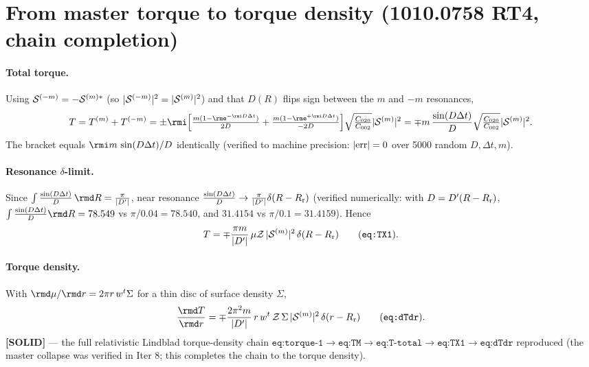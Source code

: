 \documentclass{article}
\begin{document}
\section*{From master torque to torque density (1010.0758 RT4, chain completion)}

\paragraph{Total torque.} Using ${\cal S}^{(-m)}=-{\cal S}^{(m)\ast}$ (so $|{\cal S}^{(-m)}|^2=|{\cal S}^{(m)}|^2$)
and that $D(R)$ flips sign between the $m$ and $-m$ resonances,
\begin{equation}
  T=T^{(m)}+T^{(-m)}
   =\pm\rmi\Bigl[\tfrac{m(1-\rme^{-\rmi D\Delta t})}{2D}+\tfrac{m(1-\rme^{+\rmi D\Delta t})}{-2D}\Bigr]
     \sqrt{\tfrac{C_{020}}{C_{002}}}|{\cal S}^{(m)}|^2
   =\mp m\,\frac{\sin(D\Delta t)}{D}\sqrt{\tfrac{C_{020}}{C_{002}}}|{\cal S}^{(m)}|^2 .
\end{equation}
The bracket equals $\rmi m\,\sin(D\Delta t)/D$ identically (verified to machine precision: $|{\rm err}|=0$ over
5000 random $D,\Delta t,m$).

\paragraph{Resonance $\delta$-limit.} Since $\int\frac{\sin(D\Delta t)}{D}\,\rmd R=\frac{\pi}{|D'|}$, near
resonance $\frac{\sin(D\Delta t)}{D}\to\frac{\pi}{|D'|}\delta(R-R_{\rm r})$ (verified numerically: with
$D=D'(R-R_{\rm r})$, $\int\frac{\sin(D\Delta t)}{D}\rmd R=78.549$ vs $\pi/0.04=78.540$, and $31.4154$ vs
$\pi/0.1=31.4159$). Hence
\begin{equation}
  T=\mp\frac{\pi m}{|D'|}\,\mu{\cal Z}\,|{\cal S}^{(m)}|^2\,\delta(R-R_{\rm r}) \tag{\texttt{eq:TX1}}.
\end{equation}

\paragraph{Torque density.} With $\rmd\mu/\rmd r=2\pi r\,w^t\Sigma$ for a thin disc of surface density $\Sigma$,
\begin{equation}
  \frac{\rmd T}{\rmd r}=\mp\frac{2\pi^2 m}{|D'|}\,r\,w^t\,{\cal Z}\,\Sigma\,|{\cal S}^{(m)}|^2\,
  \delta(r-R_{\rm r}) \tag{\texttt{eq:dTdr}}.
\end{equation}
\textbf{[SOLID]} — the full relativistic Lindblad torque-density chain
$\texttt{eq:torque-1}\to\texttt{eq:TM}\to\texttt{eq:T-total}\to\texttt{eq:TX1}\to\texttt{eq:dTdr}$ reproduced
(the master collapse was verified in Iter 8; this completes the chain to the torque density).
\end{document}
